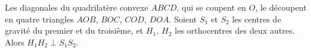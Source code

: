 Les diagonales du quadrilatère convexe $ABCD$, qui se coupent en $O$, le découpent en quatre triangles $AOB$, $BOC$, $COD$, $DOA$. Soient $S_1$ et $S_2$ les centres de gravité du premier et du troisième, et $H_1$, $H_2$ les orthocentres des deux autres. Alors $H_1H_2 \perp S_1S_2$.
